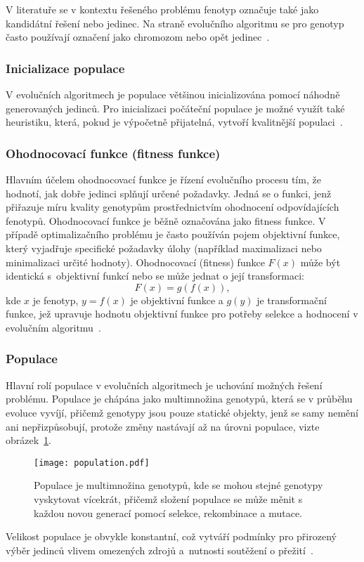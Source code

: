 V literatuře se v kontextu řešeného problému fenotyp označuje také jako kandidátní řešení nebo jedinec. 
Na straně evolučního algoritmu se pro genotyp často používají označení jako chromozom nebo opět jedinec~\cite{IntroductionToEvoComputing}.

\subsubsection*{Inicializace populace}
V evolučních algoritmech je populace většinou inicializována pomocí náhodně generovaných jedinců. 
Pro inicializaci počáteční populace je možné využít také heuristiku, která, pokud je výpočetně přijatelná, vytvoří kvalitnější populaci~\cite{IntroductionToEvoComputing}. 

\subsubsection*{Ohodnocovací funkce (fitness funkce)}
Hlavním účelem ohodnocovací funkce je řízení evolučního procesu tím, že hodnotí, jak dobře jedinci splňují určené požadavky. 
Jedná se o funkci, jenž přiřazuje míru kvality genotypům prostřednictvím ohodnocení odpovídajících fenotypů. 
Ohodnocovací funkce je běžně označována jako fitness funkce. 
V případě optimalizačního problému je často používán pojem objektivní funkce, který vyjadřuje specifické požadavky úlohy (například maximalizaci nebo minimalizaci určité hodnoty).
Ohodnocovací (fitness) funkce $F\left(x\right)$ může být identická s~objektivní funkcí nebo se může jednat o její transformaci:
\begin{equation*}
    F\left( x \right) = g\left( f \left( x \right)\right),
\end{equation*}
kde $x$ je fenotyp, $y=f\left(x\right)$ je objektivní funkce a $g\left(y\right)$ je transformační funkce, jež upravuje hodnotu objektivní funkce pro potřeby selekce a hodnocení v evolučním algoritmu~\cite{IntroductionToEvoComputing,NaturalComputing}. 

\subsubsection*{Populace}
Hlavní rolí populace v evolučních algoritmech je uchování možných řešení problému. 
Populace je chápána jako multimnožina genotypů, která se v průběhu evoluce vyvíjí, přičemž genotypy jsou pouze statické objekty, jenž se samy nemění ani nepřizpůsobují, protože změny nastávají až na úrovni populace, vizte obrázek~\ref{fig:population}. 
\begin{figure}[ht!]
    \centering
    \texttt{[image: population.pdf]}
    \caption{Populace je multimnožina genotypů, kde se mohou stejné genotypy vyskytovat vícekrát, přičemž složení populace se může měnit s každou novou generací pomocí selekce, rekombinace a mutace.}
    \label{fig:population}
\end{figure}
Velikost populace je obvykle konstantní, což vytváří podmínky pro přirozený výběr jedinců vlivem omezených zdrojů a~nutnosti soutěžení o přežití~\cite{IntroductionToEvoComputing}. 

